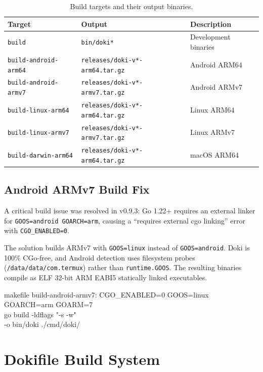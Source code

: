 \begin{table}[htbp]
  \centering
  \caption{Build targets and their output binaries.}
  \label{tab:build-targets}
  \begin{tabularx}{\textwidth}{l l X}
    \toprule
    \textbf{Target} & \textbf{Output} & \textbf{Description} \\
    \midrule
    \texttt{build}            & \texttt{bin/doki*}         & Development binaries \\
    \texttt{build-android-arm64}  & \texttt{releases/doki-v*-arm64.tar.gz}  & Android ARM64 \\
    \texttt{build-android-armv7}  & \texttt{releases/doki-v*-armv7.tar.gz}  & Android ARMv7 \\
    \texttt{build-linux-arm64}    & \texttt{releases/doki-v*-arm64.tar.gz}  & Linux ARM64 \\
    \texttt{build-linux-armv7}    & \texttt{releases/doki-v*-armv7.tar.gz}  & Linux ARMv7 \\
    \texttt{build-darwin-arm64}   & \texttt{releases/doki-v*-arm64.tar.gz}  & macOS ARM64 \\
    \bottomrule
  \end{tabularx}
\end{table}

\subsection{Android ARMv7 Build Fix}
\label{sec:armv7-fix}

A critical build issue was resolved in v0.9.3: Go 1.22+ requires
an external linker for \texttt{GOOS=android GOARCH=arm}, causing
a ``requires external cgo linking'' error with \texttt{CGO\_ENABLED=0}.

The solution builds ARMv7 with \texttt{GOOS=linux} instead of
\texttt{GOOS=android}. Doki is 100\% CGo-free, and Android detection
uses filesystem probes (\texttt{/data/data/com.termux}) rather than
\texttt{runtime.GOOS}. The resulting binaries compile as ELF 32-bit
ARM EABI5 statically linked executables.

\begin{codebox}[title={Makefile fix for ARMv7}]{makefile}
build-android-armv7:
	CGO\_ENABLED=0 GOOS=linux GOARCH=arm GOARM=7 \\
	  go build -ldflags "-s -w" \\
	  -o bin/doki ./cmd/doki/
\end{codebox}

\section{Dokifile Build System}
\label{sec:dokifile}

